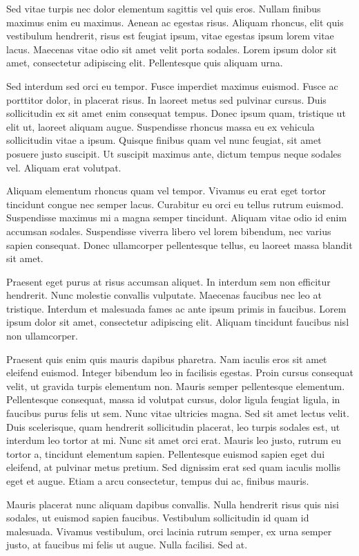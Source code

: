 Sed vitae turpis nec dolor elementum sagittis vel quis eros. Nullam finibus maximus enim eu maximus. Aenean ac egestas risus. Aliquam rhoncus, elit quis vestibulum hendrerit, risus est feugiat ipsum, vitae egestas ipsum lorem vitae lacus. Maecenas vitae odio sit amet velit porta sodales. Lorem ipsum dolor sit amet, consectetur adipiscing elit. Pellentesque quis aliquam urna.

Sed interdum sed orci eu tempor. Fusce imperdiet maximus euismod. Fusce ac porttitor dolor, in placerat risus. In laoreet metus sed pulvinar cursus. Duis sollicitudin ex sit amet enim consequat tempus. Donec ipsum quam, tristique ut elit ut, laoreet aliquam augue. Suspendisse rhoncus massa eu ex vehicula sollicitudin vitae a ipsum. Quisque finibus quam vel nunc feugiat, sit amet posuere justo suscipit. Ut suscipit maximus ante, dictum tempus neque sodales vel. Aliquam erat volutpat.

Aliquam elementum rhoncus quam vel tempor. Vivamus eu erat eget tortor tincidunt congue nec semper lacus. Curabitur eu orci eu tellus rutrum euismod. Suspendisse maximus mi a magna semper tincidunt. Aliquam vitae odio id enim accumsan sodales. Suspendisse viverra libero vel lorem bibendum, nec varius sapien consequat. Donec ullamcorper pellentesque tellus, eu laoreet massa blandit sit amet.

Praesent eget purus at risus accumsan aliquet. In interdum sem non efficitur hendrerit. Nunc molestie convallis vulputate. Maecenas faucibus nec leo at tristique. Interdum et malesuada fames ac ante ipsum primis in faucibus. Lorem ipsum dolor sit amet, consectetur adipiscing elit. Aliquam tincidunt faucibus nisl non ullamcorper.

Praesent quis enim quis mauris dapibus pharetra. Nam iaculis eros sit amet eleifend euismod. Integer bibendum leo in facilisis egestas. Proin cursus consequat velit, ut gravida turpis elementum non. Mauris semper pellentesque elementum. Pellentesque consequat, massa id volutpat cursus, dolor ligula feugiat ligula, in faucibus purus felis ut sem. Nunc vitae ultricies magna. Sed sit amet lectus velit. Duis scelerisque, quam hendrerit sollicitudin placerat, leo turpis sodales est, ut interdum leo tortor at mi. Nunc sit amet orci erat. Mauris leo justo, rutrum eu tortor a, tincidunt elementum sapien. Pellentesque euismod sapien eget dui eleifend, at pulvinar metus pretium. Sed dignissim erat sed quam iaculis mollis eget et augue. Etiam a arcu consectetur, tempus dui ac, finibus mauris.

Mauris placerat nunc aliquam dapibus convallis. Nulla hendrerit risus quis nisi sodales, ut euismod sapien faucibus. Vestibulum sollicitudin id quam id malesuada. Vivamus vestibulum, orci lacinia rutrum semper, ex urna semper justo, at faucibus mi felis ut augue. Nulla facilisi. Sed at. 
 
